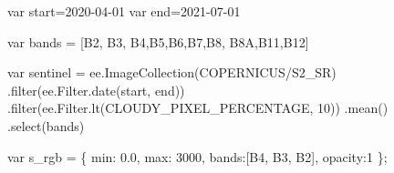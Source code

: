 \documentclass[
  letterpaper,
  DIV=11,
  numbers=noendperiod]{scrreprt}
\newenvironment{Shaded}{\begin{snugshade}}{\end{snugshade}}
\newcommand{\AttributeTok}[1]{\textcolor[rgb]{0.40,0.45,0.13}{#1}}
\newcommand{\DataTypeTok}[1]{\textcolor[rgb]{0.68,0.00,0.00}{#1}}
\newcommand{\DecValTok}[1]{\textcolor[rgb]{0.68,0.00,0.00}{#1}}
\newcommand{\FloatTok}[1]{\textcolor[rgb]{0.68,0.00,0.00}{#1}}
\newcommand{\FunctionTok}[1]{\textcolor[rgb]{0.28,0.35,0.67}{#1}}
\newcommand{\KeywordTok}[1]{\textcolor[rgb]{0.00,0.23,0.31}{#1}}
\newcommand{\NormalTok}[1]{\textcolor[rgb]{0.00,0.23,0.31}{#1}}
\newcommand{\OperatorTok}[1]{\textcolor[rgb]{0.37,0.37,0.37}{#1}}
\newcommand{\StringTok}[1]{\textcolor[rgb]{0.13,0.47,0.30}{#1}}
\begin{document}
\begin{Shaded}
\begin{Highlighting}[]
\KeywordTok{var}\NormalTok{ start}\OperatorTok{=}\StringTok{\textquotesingle{}2020{-}04{-}01\textquotesingle{}}
\KeywordTok{var}\NormalTok{ end}\OperatorTok{=}\StringTok{\textquotesingle{}2021{-}07{-}01\textquotesingle{}}

\KeywordTok{var}\NormalTok{ bands }\OperatorTok{=}\NormalTok{ [}\StringTok{\textquotesingle{}B2\textquotesingle{}}\OperatorTok{,} \StringTok{\textquotesingle{}B3\textquotesingle{}}\OperatorTok{,} \StringTok{\textquotesingle{}B4\textquotesingle{}}\OperatorTok{,}\StringTok{\textquotesingle{}B5\textquotesingle{}}\OperatorTok{,}\StringTok{\textquotesingle{}B6\textquotesingle{}}\OperatorTok{,}\StringTok{\textquotesingle{}B7\textquotesingle{}}\OperatorTok{,}\StringTok{\textquotesingle{}B8\textquotesingle{}}\OperatorTok{,} \StringTok{\textquotesingle{}B8A\textquotesingle{}}\OperatorTok{,}\StringTok{\textquotesingle{}B11\textquotesingle{}}\OperatorTok{,}\StringTok{\textquotesingle{}B12\textquotesingle{}}\NormalTok{]}

\KeywordTok{var}\NormalTok{ sentinel }\OperatorTok{=}\NormalTok{ ee}\OperatorTok{.}\FunctionTok{ImageCollection}\NormalTok{(}\StringTok{\textquotesingle{}COPERNICUS/S2\_SR\textquotesingle{}}\NormalTok{)}
                  \OperatorTok{.}\FunctionTok{filter}\NormalTok{(ee}\OperatorTok{.}\AttributeTok{Filter}\OperatorTok{.}\FunctionTok{date}\NormalTok{(start}\OperatorTok{,}\NormalTok{ end))}
                  \OperatorTok{.}\FunctionTok{filter}\NormalTok{(ee}\OperatorTok{.}\AttributeTok{Filter}\OperatorTok{.}\FunctionTok{lt}\NormalTok{(}\StringTok{\textquotesingle{}CLOUDY\_PIXEL\_PERCENTAGE\textquotesingle{}}\OperatorTok{,} \DecValTok{10}\NormalTok{))}
                  \OperatorTok{.}\FunctionTok{mean}\NormalTok{()}
                  \OperatorTok{.}\FunctionTok{select}\NormalTok{(bands)}

\KeywordTok{var}\NormalTok{ s\_rgb }\OperatorTok{=}\NormalTok{ \{}
  \DataTypeTok{min}\OperatorTok{:} \FloatTok{0.0}\OperatorTok{,}
  \DataTypeTok{max}\OperatorTok{:} \DecValTok{3000}\OperatorTok{,}
  \DataTypeTok{bands}\OperatorTok{:}\NormalTok{[}\StringTok{\textquotesingle{}B4\textquotesingle{}}\OperatorTok{,} \StringTok{\textquotesingle{}B3\textquotesingle{}}\OperatorTok{,} \StringTok{\textquotesingle{}B2\textquotesingle{}}\NormalTok{]}\OperatorTok{,}
  \DataTypeTok{opacity}\OperatorTok{:}\DecValTok{1}
\NormalTok{\}}\OperatorTok{;}
\end{Highlighting}
\end{Shaded}
\end{document}
